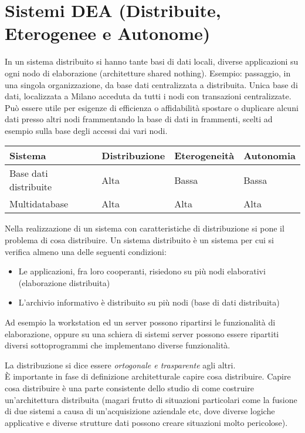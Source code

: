 \section{Sistemi DEA (Distribuite, Eterogenee e Autonome)}
In un sistema distribuito si hanno tante basi di dati locali, diverse applicazioni su ogni nodo di elaborazione (architetture shared nothing).  
Esempio: passaggio, in una singola organizzazione, da base dati centralizzata a distribuita. Unica base di dati, localizzata a Milano acceduta da tutti i nodi con transazioni centralizzate. Può essere utile per esigenze di efficienza o affidabilità spostare o duplicare alcuni dati presso altri nodi frammentando la base di dati in frammenti, scelti ad esempio sulla base degli accessi dai vari nodi. 
\begin{table}[h!]\centering
\begin{tabular}{|l|l|l|l|}
\hline
Sistema               & Distribuzione & Eterogeneità & Autonomia \\ \hline
Base dati distribuite & Alta          & Bassa        & Bassa     \\ \hline
Multidatabase         & Alta          & Alta         & Alta      \\ \hline
\end{tabular}
\end{table}

Nella realizzazione di un sistema con caratteristiche di distribuzione si pone il problema di cosa distribuire.
Un sistema distribuito è un sistema per cui si verifica almeno una delle seguenti condizioni:
\begin{itemize}
    \item Le applicazioni, fra loro cooperanti, risiedono su più nodi elaborativi (elaborazione distribuita)
    \item L’archivio informativo è distribuito su più nodi (base di dati distribuita)
\end{itemize}
Ad esempio la workstation ed un server possono ripartirsi le funzionalità di elaborazione, oppure su una schiera di sistemi server possono essere ripartiti diversi sottoprogrammi che implementano diverse funzionalità.

La distribuzione si dice essere \textit{ortogonale e trasparente} agli altri.\\
È importante in fase di definizione architetturale capire cosa distribuire. Capire cosa distribuire è una parte consistente dello studio di come costruire un'architettura distribuita (magari frutto di situazioni particolari come la fusione di due sistemi a causa di un'acquisizione aziendale etc, dove diverse logiche applicative e diverse strutture dati possono creare situazioni molto pericolose).\\

